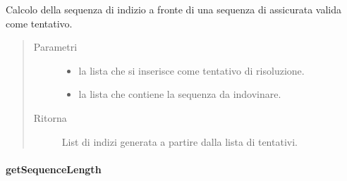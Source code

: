 \documentclass[letterpaper,10pt,italian,openany,oneside]{sphinxmanual}
\begin{document}
\begin{fulllineitems}
\label{\detokenize{source/it/unicam/cs/pa/mastermind/gamecore/BoardModel:it.unicam.cs.pa.mastermind.gamecore.BoardModel.getClueFromAttempt(List)}}
Calcolo della sequenza di  indizio a fronte di una sequenza di  assicurata valida come tentativo.
\begin{quote}\begin{description}
\item[{Parametri}] \leavevmode\begin{itemize}
\item {} 
 \textendash{} la lista che si inserisce come tentativo di risoluzione.

\item {} 
 \textendash{} la lista che contiene la sequenza da indovinare.

\end{itemize}

\item[{Ritorna}] \leavevmode
List di indizi generata a partire dalla lista di tentativi.

\end{description}\end{quote}

\end{fulllineitems}



\paragraph{getSequenceLength}
\label{\detokenize{source/it/unicam/cs/pa/mastermind/gamecore/BoardModel:getsequencelength}}
\end{document}
